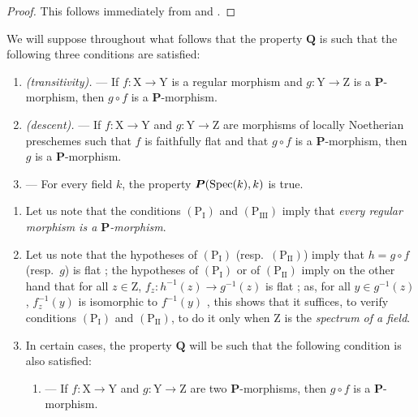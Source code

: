 \begin{proof}
This follows immediately from  and .
\end{proof}

\begin{env}[7.3.4]
\label{IV.7.3.4}
We will suppose throughout what follows that the property $\boldsymbol{Q}$ is such that the following three conditions are satisfied:
\begin{enumerate}
  \item[$(\mathrm{P_I})$] \emph{(transitivity).} ---
  If $f:\mathrm{X}\to\mathrm{Y}$ is a regular morphism  and $g:\mathrm{Y}\to\mathrm{Z}$ is a $\boldsymbol{P}$-morphism, then $g\circ f$ is a $\boldsymbol{P}$-morphism.
  \item[$(\mathrm{P_{II}})$] \emph{(descent).} ---
  If $f:\mathrm{X}\to\mathrm{Y}$ and $g:\mathrm{Y}\to\mathrm{Z}$ are morphisms of locally Noetherian preschemes such that $f$ is faithfully flat and that $g\circ f$ is a $\boldsymbol{P}$-morphism, then $g$ is a $\boldsymbol{P}$-morphism.
  \item[$(\mathrm{P_{III}})$.] ---
  For every field $k$, the property $\boldsymbol{P}(\operatorname{Spec}(k),k)$ is true.
\end{enumerate}
\end{env}

\begin{remarks}[7.3.5]
\label{IV.7.3.5}
\begin{enumerate}[label=(\roman*)]
  \item Let us note that the conditions $(\mathrm{P_I})$ and $(\mathrm{P_{III}})$ imply that \emph{every regular morphism is a $\boldsymbol{P}$-morphism}.

  \item Let us note that the hypotheses of $(\mathrm{P_I})$ (resp.~$(\mathrm{P_{II}})$) imply that $h=g\circ f$ (resp.~$g$) is flat ; the hypotheses of $(\mathrm{P_I})$ or of $(\mathrm{P_{II}})$ imply on the other hand that for all $z\in\mathrm{Z}$, $f_z:h^{-1}(z)\to g^{-1}(z)$ is flat ; as, for all $y\in g^{-1}(z)$, $f_z^{-1}(y)$ is isomorphic to $f^{-1}(y)$ , this shows that it suffices, to verify conditions $(\mathrm{P_I})$ and $(\mathrm{P_{II}})$, to do it only when $\mathrm{Z}$ is the \emph{spectrum of a field}.

  \item In certain cases, the property $\boldsymbol{Q}$ will be such that the following condition is also satisfied:
  \begin{enumerate}
    \item[$(\mathrm{P'_I})$.] ---
    If $f:\mathrm{X}\to\mathrm{Y}$ and $g:\mathrm{Y}\to\mathrm{Z}$ are two $\boldsymbol{P}$-morphisms, then $g\circ f$ is a $\boldsymbol{P}$-morphism.
  \end{enumerate}
\end{enumerate}
\end{remarks}

